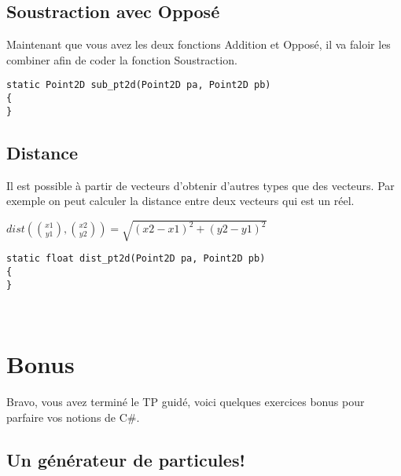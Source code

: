 \documentclass[12pt,a4paper]{report}
\begin{document}
\subsection{Soustraction avec Opposé}
Maintenant que vous avez les deux fonctions Addition et Opposé, il va
faloir les combiner afin de coder la fonction Soustraction.
\begin{lstlisting}
static Point2D sub_pt2d(Point2D pa, Point2D pb)
{
}
\end{lstlisting}
\subsection{Distance}
Il est possible à partir de vecteurs d’obtenir d’autres types que des vecteurs.
Par exemple on peut calculer la distance entre deux vecteurs qui est
un réel.\\

\begin{center}
\begin{math}
dist({x1 \choose y1} , {x2 \choose y2}) = \sqrt{(x2 - x1)^{2} + (y2 - y1)^{2}}
\end{math}
\end{center}


\begin{lstlisting}
static float dist_pt2d(Point2D pa, Point2D pb)
{
}
\end{lstlisting}	
\\
\section{Bonus}
Bravo, vous avez terminé le TP guidé, voici quelques exercices bonus pour
parfaire vos notions de C\#.
\subsection{Un générateur de particules!}
\end{document}
